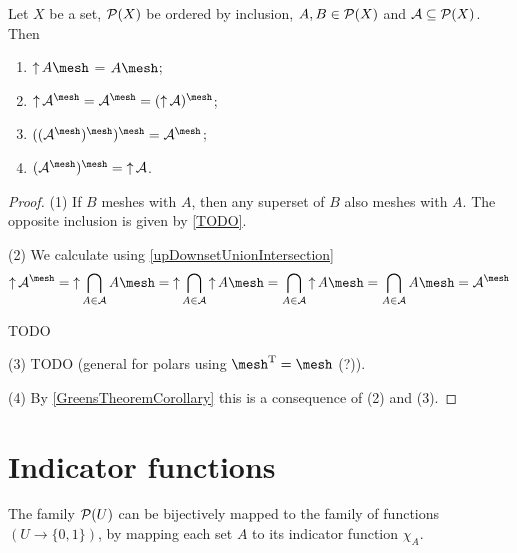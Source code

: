 \begin{lemma}
Let $X$ be a set, $\operatorname{\mathcal{P}}(X)$ be ordered by inclusion, $A, B\in \operatorname{\mathcal{P}}(X)$ and $\mathcal{A} \subseteq \operatorname{\mathcal{P}}(X)$. Then
\begin{enumerate}
\item $\upset A\mesh$ = $A\mesh$;
\item $\upset \mathcal{A}^{\mesh} = \mathcal{A}^{\mesh} = (\upset \mathcal{A})^{\mesh}$;
\item $((\mathcal{A}^{\mesh})^{\mesh})^{\mesh} = \mathcal{A}^{\mesh}$;
\item $(\mathcal{A}^{\mesh})^{\mesh} = \upset \mathcal{A}$.
\end{enumerate}
\end{lemma}
\begin{proof}
(1) If $B$ meshes with $A$, then any superset of $B$ also meshes with $A$. The opposite inclusion is given by \ref{TODO}.

(2) We calculate using \ref{upDownsetUnionIntersection}
\[ \upset \mathcal{A}^{\mesh} = \upset \bigcap_{A\in\mathcal{A}} A\mesh = \upset \bigcap_{A\in\mathcal{A}} \upset A\mesh = \bigcap_{A\in\mathcal{A}} \upset A\mesh = \bigcap_{A\in\mathcal{A}} A\mesh = \mathcal{A}^{\mesh} \]

TODO

(3) TODO (general for polars using $\mesh^\transp = \mesh$ (?)).

(4) By \ref{GreensTheoremCorollary} this is a consequence of (2) and (3).
\end{proof}

\section{Indicator functions}
The family $\operatorname{\mathcal{P}}(U)$ can be bijectively mapped to the family of functions $(U\to \{0,1\})$, by mapping each set $A$ to its indicator function $\chi_A$.

